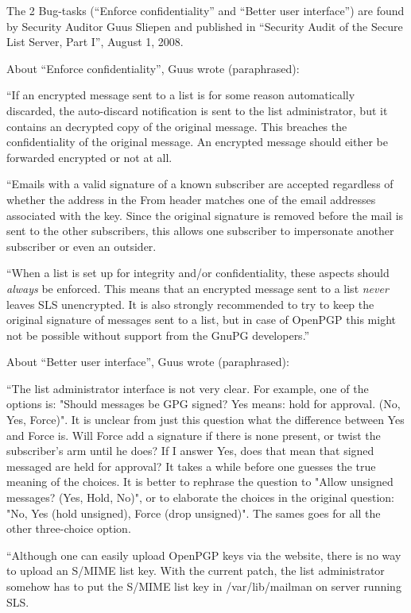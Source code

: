 \documentclass[a4]{article}
\begin{document}
The 2 Bug-tasks (``Enforce confidentiality'' and ``Better user interface'') are
found by Security Auditor Guus Sliepen and published in ``Security Audit of the
Secure List Server, Part I'', August 1, 2008.

About ``Enforce confidentiality'', Guus wrote (paraphrased):

``If an encrypted message sent to a list is for some reason automatically
discarded, the auto-discard notification is sent to the list administrator, but
it contains an decrypted copy of the original message.  This breaches the
confidentiality of the original message.  An encrypted message should either be
forwarded encrypted or not at all.

``Emails with a valid signature of a known subscriber are accepted regardless of
whether the address in the From header matches one of the email addresses
associated with the key.  Since the original signature is removed before the
mail is sent to the other subscribers, this allows one subscriber to 
impersonate another subscriber or even an outsider.

``When a list is set up for integrity and/or confidentiality, these aspects
should {\em always} be enforced.  This means that an encrypted message sent to
a list {\em never} leaves SLS unencrypted.  It is also strongly recommended to
try to keep the original signature of messages sent to a list, but in case of
OpenPGP this might not be possible without support from the GnuPG developers.''

About ``Better user interface'', Guus wrote (paraphrased):

``The list administrator interface is not very clear. For example, one of the
options is: "Should messages be GPG signed? Yes means: hold for approval. (No,
Yes, Force)". It is unclear from just this question what the difference between
Yes and Force is. Will Force add a signature if there is none present, or twist
the subscriber's arm until he does? If I answer Yes, does that mean that signed
messaged are held for approval? It takes a while before one guesses the true
meaning of the choices. It is better to rephrase the question to "Allow
unsigned messages? (Yes, Hold, No)", or to elaborate the choices in the
original question: "No, Yes (hold unsigned), Force (drop unsigned)". The sames
goes for all the other three-choice option.

``Although one can easily upload OpenPGP keys via the website, there is no way to
upload an S/MIME list key. With the current patch, the list administrator
somehow has to put the S/MIME list key in /var/lib/mailman on server running
SLS.
\end{document}

